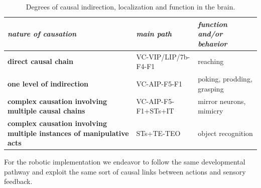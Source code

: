 \begin{table}[htbp]
\begin{center}
\begin{tabular}{|p{3.5cm}|p{2.5cm}|p{4.5cm}|}
\hline
{\it nature of causation} & {\it main path} &  {\it function and/or behavior} \\ \hline\hline
{\bf direct causal chain} & VC-VIP/LIP/7b-F4-F1 & reaching\\ \hline
{\bf one level of indirection} & VC-AIP-F5-F1 & poking, prodding, grasping\\ \hline
{\bf complex causation involving multiple causal chains} & VC-AIP-F5-F1+STs+IT & mirror neurons, mimicry\\ \hline
{\bf complex causation involving multiple instances of manipulative acts} & STs+TE-TEO & object recognition\\ \hline
\end{tabular}
\caption{
\label{tab:circuits}
%
Degrees of causal indirection, localization and function in the brain.
%
}
\end{center}
\end{table}

For the robotic implementation we endeavor to follow the same developmental
pathway and exploit the same sort of causal links between actions and 
sensory feedback.

